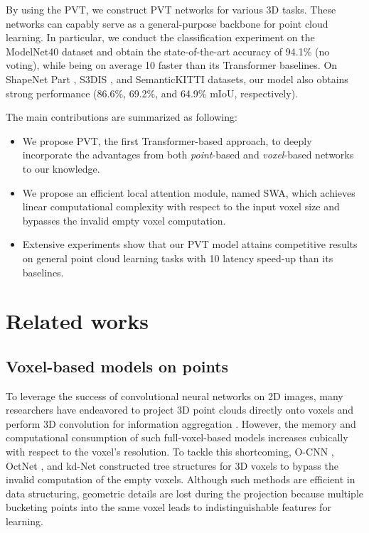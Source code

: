 \documentclass[10pt,twocolumn,letterpaper]{article}
\begin{document}
By using the PVT, we construct PVT networks for various 3D tasks. These networks can capably serve as a general-purpose backbone for point cloud learning. In particular, we conduct the classiﬁcation experiment on the ModelNet40 \cite{modelnet40} dataset and obtain the state-of-the-art accuracy of 94.1\% (no voting), while being on average 10 faster than its Transformer baselines. On ShapeNet Part \cite{shapenet}, S3DIS \cite{DBLP:journals/corr/ArmeniSZS17}, and SemanticKITTI \cite{semanticKT} datasets, our model also obtains strong performance (86.6\%, 69.2\%, and 64.9\% mIoU, respectively). 

The main contributions are summarized as following:
\begin{itemize}
\item We propose PVT, the first Transformer-based approach, to deeply incorporate the advantages from both \emph{point}-based and \emph{voxel}-based networks to our knowledge.
\item We propose an efficient local attention module, named SWA, which achieves linear computational complexity with respect to the input voxel size and bypasses the invalid empty voxel computation.
\item Extensive experiments show that our PVT model attains competitive results on general point cloud learning tasks with 10 latency speed-up than its baselines.
\end{itemize}
\section{Related works}

\subsection{Voxel-based models on points}
To leverage the success of convolutional neural networks on 2D images, many researchers have endeavored to project 3D point clouds directly onto voxels and perform 3D convolution for information aggregation \cite{20194D,2018PointGrid}. However, the memory and computational consumption of such full-voxel-based models increases cubically with respect to the voxel's resolution. To tackle this shortcoming, O-CNN \cite{2017O}, OctNet \cite{2016OctNet}, and kd-Net \cite{klokov2017escape} constructed tree structures for 3D voxels to bypass the invalid computation of the empty voxels. Although such methods are efficient in data structuring, geometric details are lost during the projection because multiple bucketing points into the same voxel leads to indistinguishable features for learning.
\end{document}
